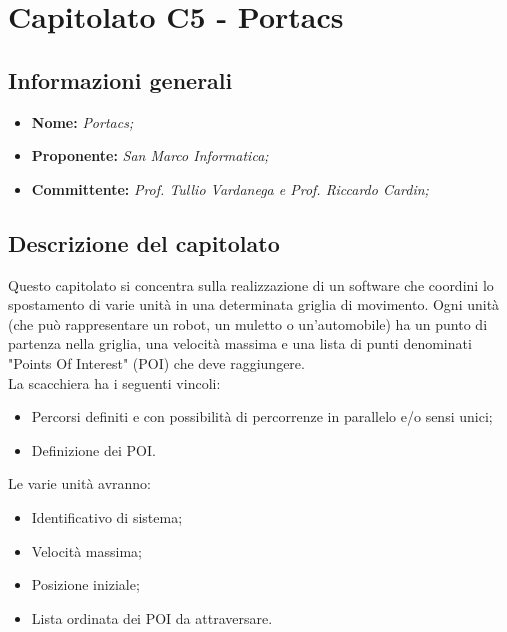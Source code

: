 \section{Capitolato C5 - Portacs}
\subsection{Informazioni generali}
	\begin{itemize}
	\item \textbf{Nome:} \textit{Portacs;}
	\item \textbf{Proponente:} \textit{San Marco Informatica;}
	\item \textbf{Committente:}  \textit{Prof. Tullio Vardanega e Prof. Riccardo Cardin;}
	\end{itemize}
\subsection{Descrizione del capitolato}
Questo capitolato si concentra sulla realizzazione di un software che coordini lo spostamento di varie unità in una determinata griglia di movimento.
Ogni unità (che può rappresentare un robot, un muletto o un'automobile) ha un punto di partenza nella griglia, una velocità massima e una lista di punti denominati "Points Of Interest" (POI) che deve raggiungere.\\
La scacchiera ha i seguenti vincoli:
\begin{itemize}
	\item Percorsi definiti e con possibilità di percorrenze in parallelo e/o sensi unici;
	\item Definizione dei POI.
\end{itemize}
Le varie unità avranno:
\begin{itemize}
	\item Identificativo di sistema;
	\item Velocità massima;
	\item Posizione iniziale;
	\item Lista ordinata dei POI da attraversare.
\end{itemize}


